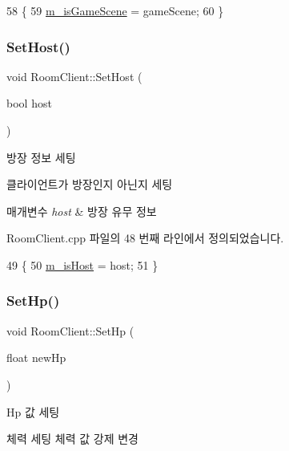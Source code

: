 \begin{DoxyCode}
58 \{
59     \hyperlink{class_room_client_a491106d1b6fbf97fd76a7d1449bf5de9}{m\_isGameScene} = gameScene;
60 \}
\end{DoxyCode}
\mbox{\label{class_room_client_abe7c9a89ab9ac294036914ca7ff169da}} 
\subsubsection{\texorpdfstring{Set\+Host()}{SetHost()}}
{\footnotesize\ttfamily void Room\+Client\+::\+Set\+Host (\begin{DoxyParamCaption}\item[{bool}]{host }\end{DoxyParamCaption})}



방장 정보 세팅 

클라이언트가 방장인지 아닌지 세팅


\begin{DoxyParams}{매개변수}
{\em host} & 방장 유무 정보 \\
\hline
\end{DoxyParams}


Room\+Client.\+cpp 파일의 48 번째 라인에서 정의되었습니다.


\begin{DoxyCode}
49 \{
50     \hyperlink{class_room_client_a09df06af0caa37c9ee7d3b91fe80b317}{m\_isHost} = host;
51 \}
\end{DoxyCode}
\mbox{\label{class_room_client_ade76f054278add2b12575b82802402c7}} 
\subsubsection{\texorpdfstring{Set\+Hp()}{SetHp()}}
{\footnotesize\ttfamily void Room\+Client\+::\+Set\+Hp (\begin{DoxyParamCaption}\item[{float}]{new\+Hp }\end{DoxyParamCaption})}



Hp 값 세팅 

체력 세팅  체력 값 강제 변경


